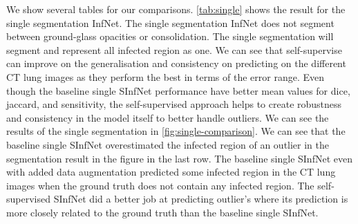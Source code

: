  We show several tables for our comparisons. \ref{tab:single} shows the result for the single segmentation InfNet. The single segmentation InfNet does not segment between ground-glass opacities or consolidation. The single segmentation will segment and represent all infected region as one. We can see that self-supervise can improve on the generalisation and consistency on predicting on the different CT lung images as they perform the best in terms of the error range. Even though the baseline single SInfNet performance have better mean values for dice, jaccard, and sensitivity, the self-supervised approach helps to create robustness and consistency in the model itself to better handle outliers. We can see the results of the single segmentation in \ref{fig:single-comparison}. We can see that the baseline single SInfNet overestimated the infected region of an outlier in the segmentation result in the figure in the last row. The baseline single SInfNet even with added data augmentation predicted some infected region in the CT lung images when the ground truth does not contain any infected region. The self-supervised SInfNet did a better job at predicting outlier's where its prediction is more closely related to the ground truth than the baseline single SInfNet.
 
